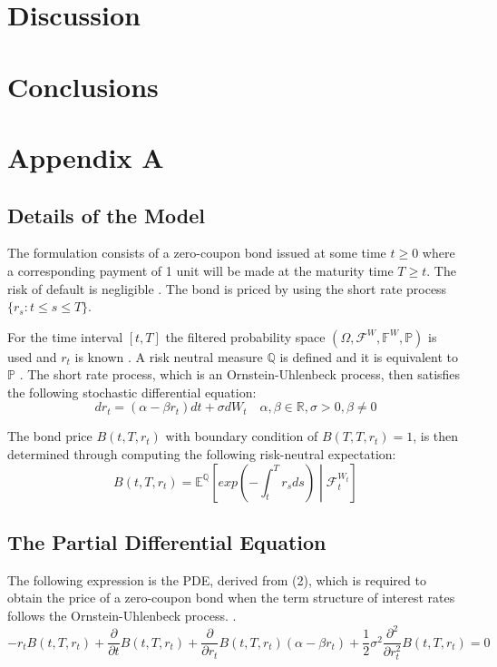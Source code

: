 \documentclass[12pt,a4paper]{article}
\begin{document}
	\section{Discussion}
	\label{sec: Discuss}
	
	\newpage
	\section{Conclusions}
	\label{sec : Concl}
	

	
	\newpage
	
		
	
	\newpage
	\appendix
	\section{Appendix A}
	\label{sec: Appendix A}
	\subsection{Details of the Model}
	\label{subsec: Details}
	The formulation consists of a zero-coupon bond issued at some time $t \geq 0$ where a corresponding payment of 1 unit will be made at the maturity time $T \geq t$. The risk of default is negligible \citep{shreve2004stochastic}. The bond is priced by using the short rate process $\{r_{s}:t \leq s \leq T\}$.
	
	For the time interval $[t,T]$ the filtered probability space $(\Omega, \mathcal{F}^W,\mathbb{F}^W,\mathbb{P})$ is used and $r_t$ is known \citep{mamon2004three}. A risk neutral measure $\mathbb{Q}$ is defined and it is equivalent to $\mathbb{P}$ \citep{shreve2004stochastic}. The short rate process, which is an Ornstein-Uhlenbeck process, then satisfies the following stochastic differential equation: 
	\begin{equation}
	dr_{t} = (\alpha-\beta r_{t})dt + \sigma dW_{t} \quad \alpha, \beta \in \mathbb{R}, \sigma>0, \beta \neq 0
	\end{equation}
	
	
	The bond price $B(t,T,r_t)$ with boundary condition of $B(T,T,r_t) = 1$, is then determined through computing the following risk-neutral expectation:
	\begin{equation}
	B(t,T,r_t) = \mathbb{E}^{\mathbb{Q}}\left[exp\left(-\int_{t}^{T}r_{s} ds\right)\middle\vert\mathcal{F}_{t}^{W_{t}}\right]
	\end{equation}
	
	
	\subsection{The Partial Differential Equation}
	\label{subsec: PDE}
	The following expression is the PDE, derived from (2), which is required to obtain the price of a zero-coupon bond when the term structure of interest rates follows the Ornstein-Uhlenbeck process. .
	$$\boxed{-r_t B(t,T,r_t) + \frac{\partial}{\partial t} B(t,T,r_t) + \frac{\partial}{\partial r_t}B(t,T,r_t)(\alpha - \beta r_t) +\frac{1}{2} \sigma^2 \frac{\partial^2}{\partial r_t^2} B(t,T,r_t) = 0 }$$
	
\end{document}
